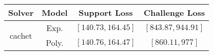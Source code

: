 \begin{tabular}{cc|c|c} 
\hline 
 Solver & Model & Support Loss  & Challenge Loss \tabularnewline\hline 
\hline 
\multirow{2}{*}{cachet} & Exp. & $\left[140.73,164.45\right]$ & $\left[843.87,944.91\right]$ \tabularnewline 
 & Poly. & $\left[140.76,164.47\right]$ & $\left[860.11,977\right]$ \tabularnewline 
\hline 
\end{tabular} 

